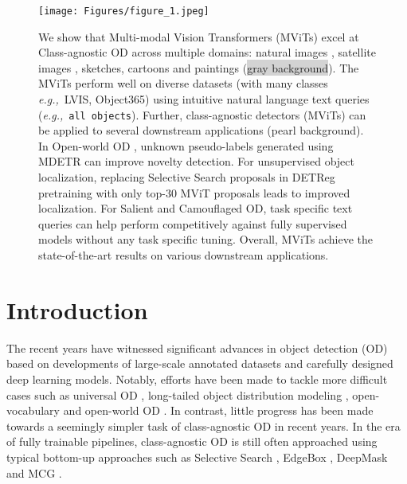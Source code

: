 \documentclass[runningheads]{llncs}
\def\eg{\emph{e.g.,}\xspace} \def\Eg{\emph{E.g.}\xspace}
\newcommand{\txt}[1]{{\texttt{#1}}}
\begin{document}
\begin{figure}[ht]
\centering
\texttt{[image: Figures/figure\_1.jpeg]}
\caption{\small We show that Multi-modal Vision Transformers (MViTs) excel at Class-agnostic
OD across multiple domains: natural images \cite{voc,coco,kitti,kitchen}, satellite images \cite{dota}, sketches, cartoons  and paintings \cite{clipart-comic-water}
(\colorbox{LightGray}{gray background}).
The MViTs perform well on diverse datasets (with many classes \eg\ LVIS, Object365) using intuitive natural language text queries
(\eg\ \txt{all objects}).
Further, class-agnostic detectors (MViTs) can be applied to several downstream applications
(\colorbox{Pearl}{pearl background}).
In Open-world OD \cite{joseph2021towards}, unknown pseudo-labels generated using MDETR \cite{mdetr} can improve novelty detection. For unsupervised object localization, replacing Selective Search proposals \cite{uijlings2013selective} in DETReg \cite{detreg} pretraining with only top-30 MViT proposals leads to improved localization. For Salient and Camouflaged OD, task specific text queries
can help perform competitively against fully supervised models without any task specific tuning. Overall, MViTs achieve the state-of-the-art results on various downstream applications.}
\label{fig:fig_1}
\end{figure}

\section{Introduction}

\label{sec:intro}

The recent years have witnessed significant advances in object detection (OD) \cite{liu2020deep} based on developments of large-scale annotated datasets and carefully designed deep learning models. Notably, efforts have been made to tackle more difficult cases such as universal OD \cite{universal}, long-tailed object distribution modeling \cite{gupta2019lvis}, open-vocabulary \cite{zareian2021open} and open-world OD \cite{joseph2021towards}. In contrast, little progress has been made towards a seemingly simpler task of class-agnostic OD \cite{alexe2010object} in recent years. In the era of fully trainable pipelines, class-agnostic OD is still often approached using typical bottom-up approaches such as Selective Search \cite{uijlings2013selective}, EdgeBox \cite{zitnick2014edge}, DeepMask \cite{pinheiro2015learning} and MCG \cite{pont2016multiscale}.
\end{document}
